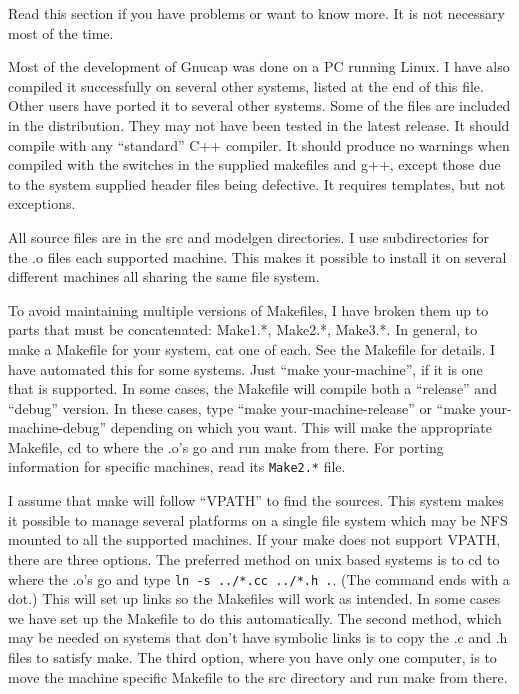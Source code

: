 Read this section if you have problems or want to know more.  It is
not necessary most of the time.

Most of the development of Gnucap was done on a PC running Linux.  I have
also compiled it successfully on several other systems, listed at the
end of this file.  Other users have ported it to several other
systems.  Some of the files are included in the distribution.  They
may not have been tested in the latest release.  It should compile
with any ``standard'' C++ compiler.  It should produce no warnings when
compiled with the switches in the supplied makefiles and g++, except
those due to the system supplied header files being defective.  It
requires templates, but not exceptions.

All source files are in the src and modelgen directories.  I use
subdirectories for the .o files each supported machine.  This makes it
possible to install it on several different machines all sharing the
same file system.

To avoid maintaining multiple versions of Makefiles, I have broken
them up to parts that must be concatenated: Make1.*, Make2.*, Make3.*.
In general, to make a Makefile for your system, cat one of each.  See
the Makefile for details.  I have automated this for some systems.
Just ``make your-machine'', if it is one that is supported.  In some
cases, the Makefile will compile both a ``release'' and ``debug''
version.  In these cases, type ``make your-machine-release'' or ``make
your-machine-debug'' depending on which you want.  This will make the
appropriate Makefile, cd to where the .o's go and run make from there.
For porting information for specific machines, read its {\tt Make2.*}
file.

I assume that make will follow ``VPATH'' to find the sources.  This
system makes it possible to manage several platforms on a single file
system which may be NFS mounted to all the supported machines.  If
your make does not support VPATH, there are three options.  The
preferred method on unix based systems is to cd to where the .o's go
and type {\tt ln -s ../*.cc ../*.h .}.  (The command ends with a dot.)
This will set up links so the Makefiles will work as intended.  In
some cases we have set up the Makefile to do this automatically.  The
second method, which may be needed on systems that don't have symbolic
links is to copy the .c and .h files to satisfy make.  The third
option, where you have only one computer, is to move the machine
specific Makefile to the src directory and run make from there.

